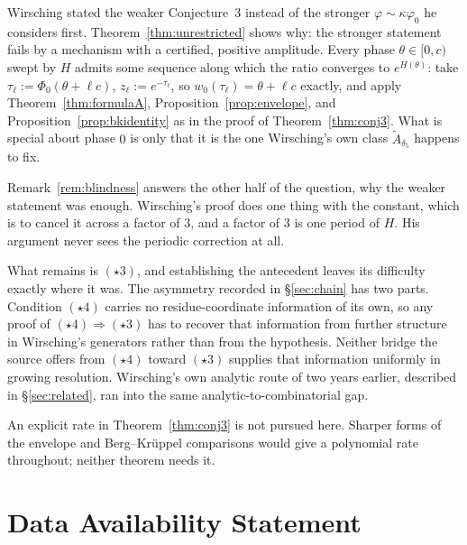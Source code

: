 \documentclass[11pt]{article}
\theoremstyle{definition}
\theoremstyle{remark}
\begin{document}
Wirsching stated the weaker Conjecture~3 instead of the stronger
$\varphi\sim\kappa\varphi_0$ he considers first.
Theorem~\ref{thm:unrestricted} shows why: the stronger statement fails
by a mechanism with a certified, positive amplitude. Every
phase $\theta\in[0,c)$ swept by $H$ admits some sequence along which the ratio converges to
$e^{H(\theta)}$: take $\tau_\ell := \Phi_0(\theta+\ell c)$, $z_\ell := e^{-\tau_\ell}$, so $w_0(\tau_\ell)=\theta+\ell c$
exactly, and apply Theorem~\ref{thm:formulaA}, Proposition~\ref{prop:envelope}, and
Proposition~\ref{prop:bkidentity} as in the proof of Theorem~\ref{thm:conj3}. What is
special about phase $0$ is only that it is the one Wirsching's own class
$\widetilde A_{\delta_5}$ happens to fix.

Remark~\ref{rem:blindness} answers the other half of the question, why
the weaker statement was enough. Wirsching's proof does one thing with
the constant, which is to cancel it across a factor of $3$, and a
factor of $3$ is one period of $H$. His argument never sees the
periodic correction at all.

What remains is $(\star3)$, and establishing the antecedent leaves its
difficulty exactly where it was. The asymmetry recorded in
\S\ref{sec:chain} has two parts. Condition $(\star4)$ carries no
residue-coordinate information of its own, so any proof of
$(\star4)\Rightarrow(\star3)$ has to recover that information from
further structure in Wirsching's generators rather than from the
hypothesis. Neither bridge the source offers from $(\star4)$
toward $(\star3)$ supplies that information uniformly in growing
resolution. Wirsching's own analytic route of two years
earlier, described in \S\ref{sec:related}, ran into the same
analytic-to-combinatorial gap.

An explicit rate in Theorem~\ref{thm:conj3} is not pursued here.
Sharper forms of the envelope and Berg--Kr\"uppel comparisons would
give a polynomial rate throughout; neither theorem needs it.

\section*{Data Availability Statement}
\end{document}
